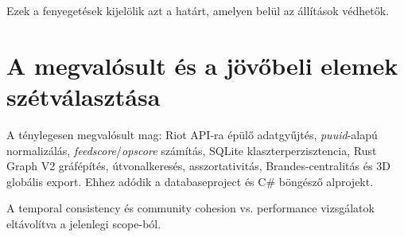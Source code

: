 Ezek a fenyegetések kijelölik azt a határt, amelyen belül az állítások védhetők.

\section{A megvalósult és a jövőbeli elemek szétválasztása}

A ténylegesen megvalósult mag: Riot API-ra épülő adatgyűjtés, \textit{puuid}-alapú normalizálás, \textit{feedscore}/\textit{opscore} számítás, SQLite klaszterperzisztencia, Rust Graph V2 gráfépítés, útvonalkeresés, asszortativitás, Brandes-centralitás és 3D globális export. Ehhez adódik a databaseproject és C\# böngésző alprojekt.

A temporal consistency és community cohesion vs. performance vizsgálatok eltávolítva a jelenlegi scope-ból.
